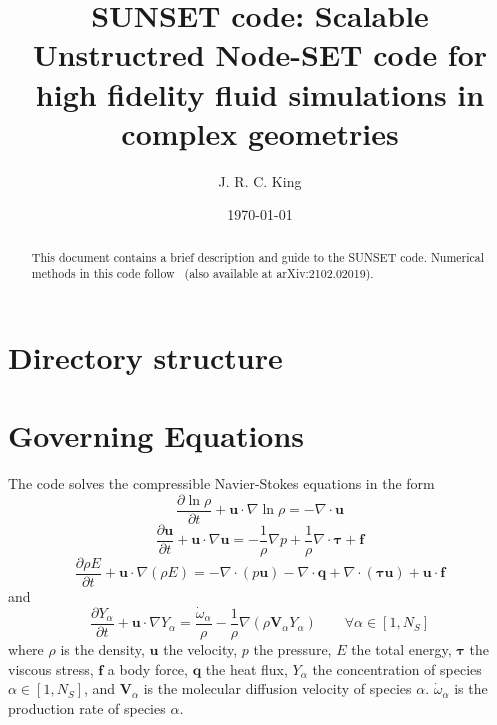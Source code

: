 \documentclass[notitlepage]{article}
\begin{document}
\title{SUNSET code: Scalable Unstructred Node-SET code for high fidelity fluid simulations in complex geometries}

\author{J. R. C. King}
\date{\today}
\begin{abstract}

This document contains a brief description and guide to the SUNSET code. Numerical methods in this code follow~\cite{king_labfm_2022} (also available at arXiv:2102.02019).

\end{abstract}

\maketitle

\section{Directory structure}




\section{Governing Equations}\label{ge}

The code solves the compressible Navier-Stokes equations in the form
\begin{equation}\frac{\partial\ln\rho}{\partial{t}}+\bm{u}\cdot\nabla\ln\rho=-\nabla\cdot\bm{u}\label{eq:mass}\end{equation}
\begin{equation}\frac{\partial\bm{u}}{\partial{t}}+\bm{u}\cdot\nabla\bm{u}=-\frac{1}{\rho}\nabla{p}+\frac{1}{\rho}\nabla\cdot\bm{\tau}+\bm{f}\label{eq:mom}\end{equation}
\begin{equation}\frac{\partial\rho{E}}{\partial{t}}+\bm{u}\cdot\nabla\left(\rho{E}\right)=-\nabla\cdot\left(p\bm{u}\right)-\nabla\cdot\bm{q}+\nabla\cdot\left(\bm{\tau}\bm{u}\right)+\bm{u}\cdot\bm{f}\label{eq:en}\end{equation}
and
\begin{equation}\frac{\partial{Y}_{\alpha}}{\partial{t}}+\bm{u}\cdot\nabla{Y}_{\alpha}=\frac{\dot\omega_{\alpha}}{\rho}-\frac{1}{\rho}\nabla\left(\rho\bm{V}_{\alpha}Y_{\alpha}\right)\qquad\forall\alpha\in\left[1,N_{S}\right]\label{eq:Y}\end{equation}
where $\rho$ is the density, $\bm{u}$ the velocity, $p$ the pressure, $E$ the total energy, $\bm{\tau}$ the viscous stress, $\bm{f}$ a body force, $\bm{q}$ the heat flux, $Y_{\alpha}$ the concentration of species $\alpha\in\left[1,N_{S}\right]$, and $\bm{V}_{\alpha}$ is the molecular diffusion velocity of species $\alpha$. $\dot\omega_{\alpha}$ is the production rate of species $\alpha$.
\end{document}
